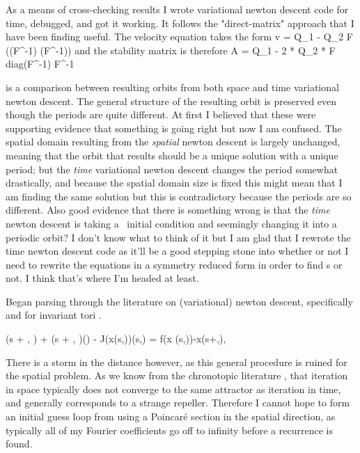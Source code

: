 As a means of cross-checking results I wrote variational {newton descent} code for time, debugged, and got it working. It follows the "direct-matrix" approach
that I have been finding useful.
The velocity equation takes the form
\beq \label{e-MNGkstimeDM}
v = Q_1 \cdot \utensor - Q_2 \cdot F \cdot ((F^{-1}\utensor) \star (F^{-1}\utensor))
\eeq
and the stability matrix is therefore
\beq
A = Q_1 - 2 * Q_2 * \cdot F \cdot diag(F^{-1}\utensor) \cdot F^{-1}
\eeq

 is a comparison between resulting orbits from both space and time variational {newton descent}.
The general structure of the resulting orbit is preserved even though the periods are quite different. At first I believed that
these were supporting evidence that something is going right but now I am confused. The spatial domain resulting from the \emph{spatial}
{newton descent} is largely unchanged, meaning that the orbit that results should be a unique solution with a unique period; but the \emph{time}
variational {newton descent} changes the period somewhat drastically, and because the spatial domain size is fixed this might mean that I am
finding the same solution but this is contradictory because the periods are so different. Also good evidence that there is something wrong is that
the \emph{time} {newton descent} is taking a \rpo\ initial condition and seemingly changing it into a periodic orbit? I don't know what
to think of it but I am glad that I rewrote the time {newton descent} code as it'll be a good stepping stone into whether or not I need to rewrite the equations
in a symmetry reduced form in order to find {\rpo}s or not. I think that's where I'm headed at least.

Began parsing through the literature on (variational) {newton descent},
specifically  and for invariant tori
.


\beq
{}(s + \omega, \tau) + 
(s + \omega, \tau)\frac{\partial \omega}{\partial \tau}(\tau) - J(x(s,\tau))(s,\tau) =
f(x (s,\tau))-x(s+\omega,\tau),


There is a storm in the distance however, as this general procedure is ruined for the spatial problem.
As we know from the chronotopic literature ,
that iteration in space typically does not converge to the same attractor as iteration in time,
and generally corresponds to a strange repeller. Therefore I cannot hope to form an initial guess
loop from using a Poincar\'e section in the spatial direction,
 as typically all of my Fourier coefficients go off to infinity before a recurrence is found.


